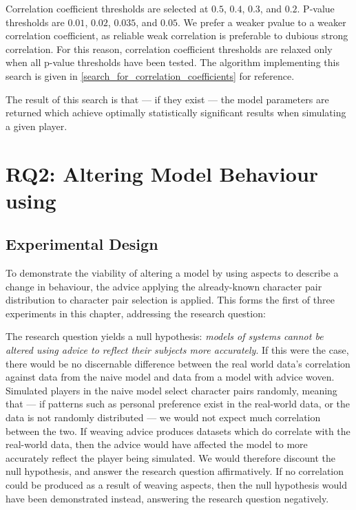 Correlation coefficient thresholds are selected at $0.5$, $0.4$, $0.3$, and
$0.2$. P-value thresholds are $0.01$, $0.02$, $0.035$, and $0.05$. We prefer a
weaker pvalue to a weaker correlation coefficient, as reliable weak correlation
is preferable to dubious strong correlation. For this reason, correlation
coefficient thresholds are relaxed only when all p-value thresholds have been
tested. The algorithm implementing this search is given in
\cref{search_for_correlation_coefficients} for reference.

The result of this search is that --- if they exist --- the model parameters are
returned which achieve optimally statistically significant results when
simulating a given player.



\section{RQ2: Altering Model Behaviour using \AspectOrientation}
\label{rq2_results}

\subsection{Experimental Design}

To demonstrate the viability of altering a model by using aspects to describe a
change in behaviour, the advice applying the already-known character pair
distribution to character pair selection is applied. This forms the first of
three experiments in this chapter, addressing the research question:

\begin{researchquestion}
\rqtwo{}
\end{researchquestion}

The research question yields a null hypothesis: \emph{models of systems cannot
be altered using advice to reflect their subjects more accurately}. If this were
the case, there would be no discernable difference between the real world data's
correlation against data from the naive model and data from a model with advice
woven. Simulated players in the naive model select character pairs randomly,
meaning that --- if patterns such as personal preference exist in the real-world
data, or the data is not randomly distributed --- we would not expect much
correlation between the two. If weaving advice produces datasets which do
correlate with the real-world data, then the advice would have affected the
model to more accurately reflect the player being simulated. We would therefore
discount the null hypothesis, and answer the research question affirmatively. If
no correlation could be produced as a result of weaving aspects, then the null
hypothesis would have been demonstrated instead, answering the research question
negatively.

